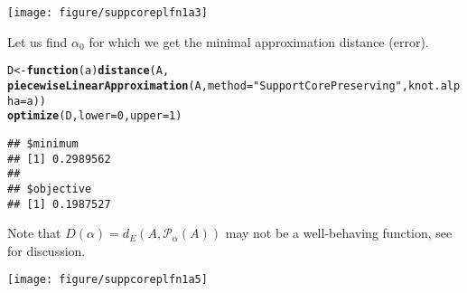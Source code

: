 \documentclass[11pt]{article}\usepackage[]{graphicx}\usepackage[]{color}
\makeatletter
\newcommand{\hlnum}[1]{\textcolor[rgb]{0.686,0.059,0.569}{#1}}%
\newcommand{\hlstr}[1]{\textcolor[rgb]{0.192,0.494,0.8}{#1}}%
\newcommand{\hlstd}[1]{\textcolor[rgb]{0.345,0.345,0.345}{#1}}%
\newcommand{\hlkwa}[1]{\textcolor[rgb]{0.161,0.373,0.58}{\textbf{#1}}}%
\newcommand{\hlkwb}[1]{\textcolor[rgb]{0.69,0.353,0.396}{#1}}%
\newcommand{\hlkwc}[1]{\textcolor[rgb]{0.333,0.667,0.333}{#1}}%
\newcommand{\hlkwd}[1]{\textcolor[rgb]{0.737,0.353,0.396}{\textbf{#1}}}%
\newenvironment{kframe}{%
 \def\at@end@of@kframe{}%
 \ifinner\ifhmode%
  \def\at@end@of@kframe{\end{minipage}}%
  \begin{minipage}{\columnwidth}%
 \fi\fi%
 \def\FrameCommand##1{\hskip\@totalleftmargin \hskip-\fboxsep
 \colorbox{shadecolor}{##1}\hskip-\fboxsep
     \hskip-\linewidth \hskip-\@totalleftmargin \hskip\columnwidth}%
 \MakeFramed {\advance\hsize-\width
   \@totalleftmargin\z@ \linewidth\hsize
   \@setminipage}}%
 {\par\unskip\endMakeFramed%
 \at@end@of@kframe}
\newenvironment{knitrout}{}{} %
\makeatother
\begin{document}
\begin{center}
\begin{knitrout}\small
{}\color{fgcolor}

{\centering \texttt{[image: figure/suppcoreplfn1a3]} 

}



\end{knitrout}
\end{center}

Let us find $\alpha_0$ for which we get the minimal approximation
distance (error).

\begin{knitrout}\small
{}\color{fgcolor}\begin{kframe}
\begin{alltt}
\hlstd{D} \hlkwb{<-} \hlkwa{function}\hlstd{(}\hlkwc{a}\hlstd{)} \hlkwd{distance}\hlstd{(A,}
   \hlkwd{piecewiseLinearApproximation}\hlstd{(A,} \hlkwc{method}\hlstd{=}\hlstr{"SupportCorePreserving"}\hlstd{,} \hlkwc{knot.alpha}\hlstd{=a))}
\hlkwd{optimize}\hlstd{(D,} \hlkwc{lower}\hlstd{=}\hlnum{0}\hlstd{,} \hlkwc{upper}\hlstd{=}\hlnum{1}\hlstd{)}
\end{alltt}
\begin{verbatim}
## $minimum
## [1] 0.2989562
## 
## $objective
## [1] 0.1987527
\end{verbatim}
\end{kframe}
\end{knitrout}

Note that $D(\alpha)=d_E(A,\mathcal{P}_\alpha(A))$ may not be a well-behaving function, see
\cite{CoroianuETAL2014:piecewise1suppcore} for discussion.

\begin{center}
\begin{knitrout}\small
{}\color{fgcolor}

{\centering \texttt{[image: figure/suppcoreplfn1a5]} 

}



\end{knitrout}
\end{center}
\end{document}
